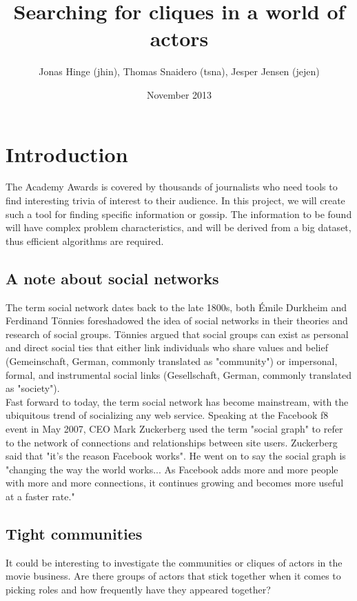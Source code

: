 \documentclass{article}
\title{Searching for cliques in a world of actors}
\author{Jonas Hinge (jhin), Thomas Snaidero (tsna), Jesper Jensen (jejen)}
\date{November 2013}
\begin{document}
\maketitle

\section{Introduction}
The Academy Awards is covered by thousands of journalists who need tools to find interesting trivia of interest to their audience. In this project, we will create such a tool for finding specific information or gossip. The information to be found will have complex problem characteristics, and will be derived from a big dataset, thus efficient algorithms are required.

\subsection{A note about social networks}
The term social network dates back to the late 1800s, both Émile Durkheim and Ferdinand Tönnies foreshadowed the idea of social networks in their theories and research of social groups. Tönnies argued that social groups can exist as personal and direct social ties that either link individuals who share values and belief (Gemeinschaft, German, commonly translated as "community") or impersonal, formal, and instrumental social links (Gesellschaft, German, commonly translated as "society"). \\

Fast forward to today, the term social network has become mainstream, with the ubiquitous trend of socializing any web service. Speaking at the Facebook f8 event in May 2007, CEO Mark Zuckerberg used the term "social graph" to refer to the network of connections and relationships between site users. Zuckerberg said that "it's the reason Facebook works". He went on to say the social graph is "changing the way the world works... As Facebook adds more and more people with more and more connections, it continues growing and becomes more useful at a faster rate." \cite{socialgraphwiki} \\


\subsection{Tight communities}
It could be interesting to investigate the communities or cliques of actors in the movie business. Are there groups of actors that stick together when it comes to picking roles and how frequently have they appeared together?
\end{document}
